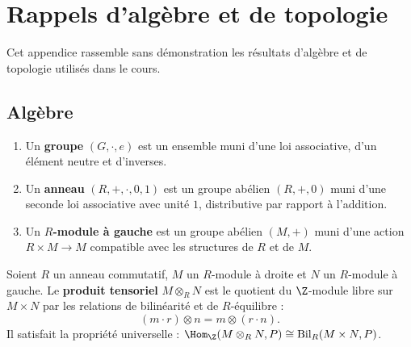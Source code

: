 


\appendix

\chapter{Rappels d'algèbre et de topologie}\label{app:rappels}
\minitoc

\vspace{1em}

Cet appendice rassemble sans démonstration les résultats d'algèbre
et de topologie utilisés dans le cours.

\section{Algèbre}\label{sec:rappels-algebre}


\begin{definition}\label{def:rappel-structures}
\begin{enumerate}[label=(\roman*)]
\item Un \textbf{groupe} $(G, \cdot, e)$ est un ensemble muni d'une
      loi associative, d'un élément neutre et d'inverses.

\item Un \textbf{anneau} $(R, +, \cdot, 0, 1)$ est un groupe abélien
      $(R, +, 0)$ muni d'une seconde loi associative avec unité $1$,
      distributive par rapport à l'addition.

\item Un \textbf{$R$-module à gauche} est un groupe abélien $(M, +)$
      muni d'une action $R \times M \to M$ compatible avec les
      structures de $R$ et de $M$.
\end{enumerate}
\end{definition}

\begin{proposition}\label{prop:rappel-tensoriel}
Soient $R$ un anneau commutatif, $M$ un $R$-module à droite et $N$
un $R$-module à gauche.  Le \textbf{produit tensoriel}
$M \otimes_R N$ est le quotient du $\Z$-module libre sur
$M \times N$ par les relations de bilinéarité et de $R$-équilibre :
\[
  (m \cdot r) \otimes n = m \otimes (r \cdot n).
\]
Il satisfait la propriété universelle :
$\Hom_\Z(M \otimes_R N, P) \cong \mathrm{Bil}_R(M \times N, P)$.
\end{proposition}

